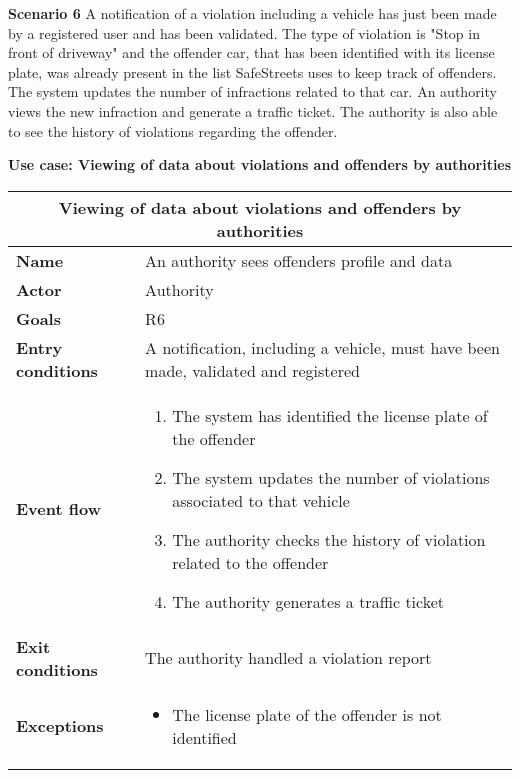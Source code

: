 \begin{description}
    \item \label{scenario6} \textbf{Scenario 6} \newline
        A notification of a violation including a vehicle has just been made by a registered user and has been validated. The type of violation is "Stop in front of driveway" and the offender car, that has been identified with its license plate, was already present in the list SafeStreets uses to keep track of offenders. The system updates the number of infractions related to that car. An authority views the new infraction and generate a traffic ticket. The authority is also able to see the history of violations regarding the offender.

    \item \textbf{Use case: Viewing of data about violations and offenders by authorities}
    \begin{center}
        \begin{tabular}{|p{3cm}|p{7cm}|}
            \multicolumn{2}{c}{\textbf{Viewing of data about violations and offenders by authorities}} \\
            \hline
            \textbf{Name} & An authority sees offenders profile and data \\
            \hline
            \textbf{Actor} & Authority \\
            \hline
            \textbf{Goals} & R6 \\
            \hline
            \textbf{Entry conditions} & A notification, including a vehicle, must have been made, validated and registered \\
            \hline
            \textbf{Event flow} &
            \begin{enumerate}
                \item The system has identified the license plate of the offender
                \item The system updates the number of violations associated to that vehicle
                \item The authority checks the history of violation related to the offender
                \item The authority generates a traffic ticket
            \end{enumerate} \\
            \hline
            \textbf{Exit conditions} & The authority handled a violation report \\
            \hline
            \textbf{Exceptions}
            & \begin{itemize}
                \item The license plate of the offender is not identified
            \end{itemize} \\
            \hline
        \end{tabular}
    \end{center}
\end{description}


